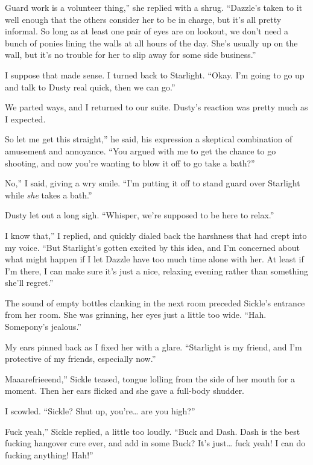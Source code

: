 \leavevmode{}Guard work is a volunteer thing,” she replied with a shrug. “Dazzle’s taken to it well enough that the others consider her to be in charge, but it’s all pretty informal. So long as at least one pair of eyes are on lookout, we don’t need a bunch of ponies lining the walls at all hours of the day. She’s usually up on the wall, but it’s no trouble for her to slip away for some side business.”

I suppose that made sense. I turned back to Starlight. “Okay. I’m going to go up and talk to Dusty real quick, then we can go.”

We parted ways, and I returned to our suite. Dusty’s reaction was pretty much as I expected.

\leavevmode{}So let me get this straight,” he said, his expression a skeptical combination of amusement and annoyance. “You argued with me to get the chance to go shooting, and now you’re wanting to blow it off to go take a bath?”

\leavevmode{}No,” I said, giving a wry smile. “I’m putting it off to stand guard over Starlight while \textit{she} takes a bath.”

Dusty let out a long sigh. “Whisper, we’re supposed to be here to relax.”

\leavevmode{}I know that,” I replied, and quickly dialed back the harshness that had crept into my voice. “But Starlight’s gotten excited by this idea, and I’m concerned about what might happen if I let Dazzle have too much time alone with her. At least if I’m there, I can make sure it’s just a nice, relaxing evening rather than something she’ll regret.”

The sound of empty bottles clanking in the next room preceded Sickle’s entrance from her room. She was grinning, her eyes just a little too wide. “Hah. Somepony’s jealous.”

My ears pinned back as I fixed her with a glare. “Starlight is my friend, and I’m protective of my friends, especially now.”

\leavevmode{}Maaarefrieeend,” Sickle teased, tongue lolling from the side of her mouth for a moment. Then her ears flicked and she gave a full-body shudder.

I scowled. “Sickle? Shut up, you’re… are you high?”

\leavevmode{}Fuck yeah,” Sickle replied, a little too loudly. “Buck and Dash. Dash is the best fucking hangover cure ever, and add in some Buck? It’s just… fuck yeah! I can do fucking anything! Hah!”

